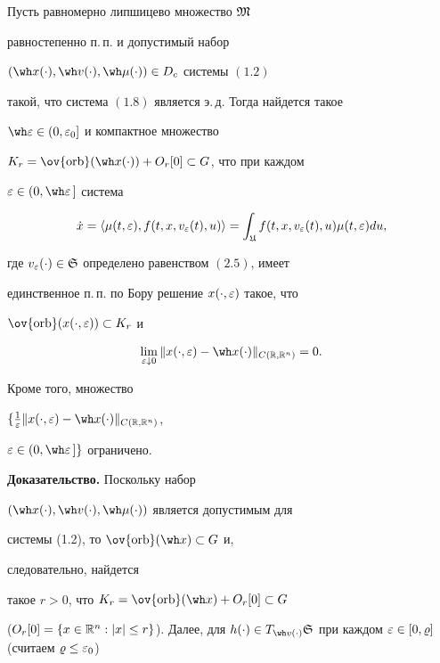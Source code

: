 \begin{thms}


Пусть равномерно липшицево множество $\frak M$


равностепенно п.\,п. и допустимый набор


$(\wh x(\cdot),\wh v(\cdot),\wh\mu(\cdot))\in D_{c}$ системы $(1.2)$


такой, что система $(1.8)$ является э.\,д. Тогда найдется такое


$\wh\ve\in(0,\ve_{0}]$ и компактное множество


$K_{r}=\ov{\orb}(\wh x(\cdot))+O_{r}[0]\subset G$, что при каждом


$\ve\in(0,\wh\ve\,]$ система


\begin{equation}


\Dot x=\la\mu(t,\ve),f(t,x,v_{\ve}(t),u)\ra=\int_{\gU}


f(t,x,v_{\ve}(t),u)\mu(t,\ve)du,


\end{equation}


где $v_{\varepsilon}(\cdot)\in\frak S$ определено равенством $(2.5)$, имеет


единственное п.\,п. по Бору решение $x(\cdot,\varepsilon)$ такое, что


$\ov{\orb}(x(\cdot,\ve))\subset K_{r}$ и


\begin{equation}


\lim_{\ve\downarrow0}\|x(\cdot,\ve)-\wh x(\cdot)\|_{C(\R,\R^{n})}=0.


\end{equation}


Кроме того, множество


$\{\frac{1}{\ve}\|x(\cdot,\ve)-\wh x(\cdot)\|_{C(\R,\R^{n})}$,


$\ve\in(0,\wh\ve\,]\}$ ограничено.


\end{thms}





{\bf Доказательство.} Поскольку набор


$(\wh x(\cdot),\wh v(\cdot), \wh\mu(\cdot))$ является допустимым для


системы (1.2), то $\ov{\orb}(\wh x)\subset G$ и,


следовательно, найдется


такое $r>0$, что $K_r=\ov{\orb}(\wh x)+O_r[0]\subset G$


($O_r[0]=\{x\in\R^n: |x|\le r\}$). Далее, для $h(\cdot)\in T_{\wh


v(\cdot)}\gS$ при каждом $\ve\in[0,\vr]$ (считаем $\vr\le\ve_0$)


